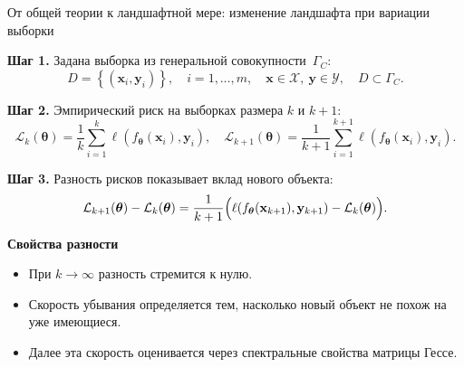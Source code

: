 \documentclass[10pt,pdf,hyperref={unicode}]{beamer}
\begin{document}
\begin{frame}{От общей теории к ландшафтной мере: изменение ландшафта при вариации выборки}
\justifying

\textbf{Шаг 1.} Задана выборка из генеральной совокупности~$\Gamma_C$:
\[
    D = \left\{ (\mathbf{x}_i, \mathbf{y}_i) \right\}, \quad i = 1, \ldots, m, \quad \mathbf{x} \in \mathcal{X}, \ \mathbf{y} \in \mathcal{Y}, \quad D\subset \Gamma_C.
\]

\textbf{Шаг 2.} Эмпирический риск на выборках размера $k$ и $k+1$:
\[
\mathcal{L}_k(\boldsymbol{\theta}) = \frac{1}{k}\sum_{i=1}^k \ell(f_{\boldsymbol{\theta}}(\mathbf{x}_i), \mathbf{y}_i), \quad 
\mathcal{L}_{k+1}(\boldsymbol{\theta}) = \frac{1}{k+1}\sum_{i=1}^{k+1} \ell(f_{\boldsymbol{\theta}}(\mathbf{x}_i), \mathbf{y}_i).
\]

\textbf{Шаг 3.} Разность рисков показывает вклад нового объекта:
\[
\mathcal{L}_{k+1}(\boldsymbol{\theta}) - \mathcal{L}_k(\boldsymbol{\theta}) = 
\frac{1}{k+1}\Bigl(\ell(f_{\boldsymbol{\theta}}(\mathbf{x}_{k+1}), \mathbf{y}_{k+1}) - \mathcal{L}_k(\boldsymbol{\theta})\Bigr).
\]

\vspace{0.15cm}
\textbf{Свойства разности}
\begin{itemize}
    \item При $k\to\infty$ разность стремится к нулю.
    \item Скорость убывания определяется тем, насколько новый объект не похож на уже имеющиеся.
    \item Далее эта скорость оценивается через спектральные свойства матрицы Гессе.
\end{itemize}
\end{frame}
\end{document}
